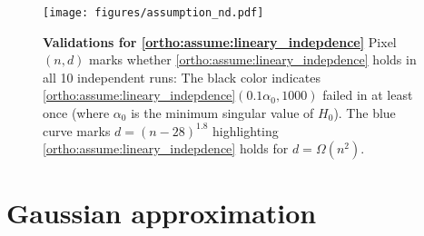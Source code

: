\begin{figure}[!ht]
     \centering
         \texttt{[image: figures/assumption\_nd.pdf]}
    \caption{\footnotesize{\textbf{Validations for \ref{ortho:assume:lineary_indepdence}} Pixel $(n,d)$ marks whether \ref{ortho:assume:lineary_indepdence} holds in all 10 independent runs: The black color indicates \ref{ortho:assume:lineary_indepdence}$(0.1\alpha_0,1000)$ failed in at least once (where $\alpha_0$ is the minimum singular value of $H_0$). The blue curve marks $d=(n-28)^{1.8}$ highlighting \ref{ortho:assume:lineary_indepdence} holds for $d = \Omega(n^2)$.} }
    \label{ortho:fig:assumption_nd}
\end{figure}



\section{Gaussian approximation} \label{ortho:sec:normal_approximation}
